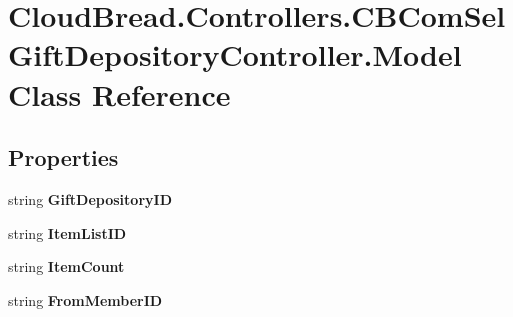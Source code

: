 \hypertarget{class_cloud_bread_1_1_controllers_1_1_c_b_com_sel_gift_depository_controller_1_1_model}{}\section{Cloud\+Bread.\+Controllers.\+C\+B\+Com\+Sel\+Gift\+Depository\+Controller.\+Model Class Reference}
\label{class_cloud_bread_1_1_controllers_1_1_c_b_com_sel_gift_depository_controller_1_1_model}
\subsection*{Properties}
\begin{DoxyCompactItemize}
\item 
string {\bfseries Gift\+Depository\+ID}\hypertarget{class_cloud_bread_1_1_controllers_1_1_c_b_com_sel_gift_depository_controller_1_1_model_a2631cb6638ed7a4656db7bbd2b977fce}{}\label{class_cloud_bread_1_1_controllers_1_1_c_b_com_sel_gift_depository_controller_1_1_model_a2631cb6638ed7a4656db7bbd2b977fce}

\item 
string {\bfseries Item\+List\+ID}\hypertarget{class_cloud_bread_1_1_controllers_1_1_c_b_com_sel_gift_depository_controller_1_1_model_a75badb87e212b161709498ed1845e6de}{}\label{class_cloud_bread_1_1_controllers_1_1_c_b_com_sel_gift_depository_controller_1_1_model_a75badb87e212b161709498ed1845e6de}

\item 
string {\bfseries Item\+Count}\hypertarget{class_cloud_bread_1_1_controllers_1_1_c_b_com_sel_gift_depository_controller_1_1_model_a909734e7687ad8bec57b75d3ad1698ae}{}\label{class_cloud_bread_1_1_controllers_1_1_c_b_com_sel_gift_depository_controller_1_1_model_a909734e7687ad8bec57b75d3ad1698ae}

\item 
string {\bfseries From\+Member\+ID}\hypertarget{class_cloud_bread_1_1_controllers_1_1_c_b_com_sel_gift_depository_controller_1_1_model_a4318291cfaa7d5219808c905cf9d27ff}{}\label{class_cloud_bread_1_1_controllers_1_1_c_b_com_sel_gift_depository_controller_1_1_model_a4318291cfaa7d5219808c905cf9d27ff}


\end{DoxyCompactItemize}
